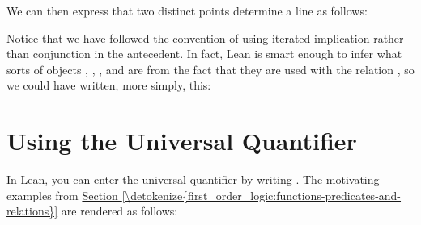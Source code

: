 \documentclass[letterpaper,10pt,english]{sphinxmanual}
\begin{document}
\begin{sphinxVerbatim}[commandchars=\\\{\}]
    
       
\end{sphinxVerbatim}

\sphinxAtStartPar
We can then express that two distinct points determine a line as follows:

\begin{sphinxVerbatim}[commandchars=\\\{\}]
         
                       
                
\end{sphinxVerbatim}

\sphinxAtStartPar
Notice that we have followed the convention of using iterated implication rather than conjunction in the antecedent. In fact, Lean is smart enough to infer what sorts of objects , , , and  are from the fact that they are used with the relation , so we could have written, more simply, this:

\begin{sphinxVerbatim}[commandchars=\\\{\}]
                 
            
\end{sphinxVerbatim}


\section{Using the Universal Quantifier}
\label{\detokenize{first_order_logic_in_lean:using-the-universal-quantifier}}
\sphinxAtStartPar
In Lean, you can enter the universal quantifier by writing . The motivating examples from \hyperref[\detokenize{first_order_logic:functions-predicates-and-relations}]{Section \ref{\detokenize{first_order_logic:functions-predicates-and-relations}}} are rendered as follows:
\end{document}
